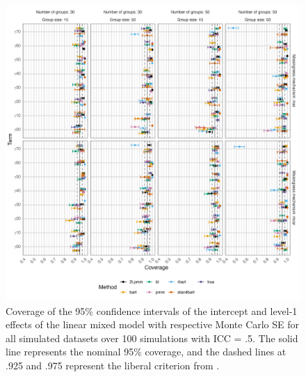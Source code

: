 \documentclass[10pt, a4paper, titlepage]{article}
\begin{document}
\begin{figure}[H]
    \centering
    \includegraphics[width=1\textwidth]{coveragelevel1.png}
    \caption{Coverage of the 95\% confidence intervals of the intercept and level-1 effects of the linear mixed model with respective Monte Carlo SE for all simulated datasets over 100 simulations with ICC = .5. The solid line represents the nominal 95\% coverage, and the dashed lines at .925 and .975 represent the liberal criterion from \citet{bradley1978}.}
    \label{fig:coveragelevel1}
\end{figure}
\end{document}

